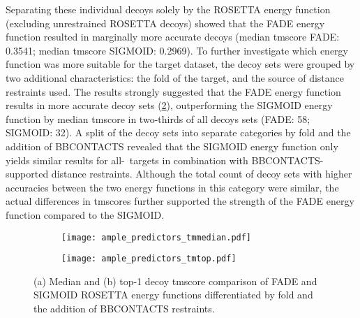 Separating these individual decoys solely by the ROSETTA energy function (excluding unrestrained ROSETTA decoys) showed that the FADE energy function resulted in marginally more accurate decoys (median \gls{tmscore} FADE: 0.3541; median \gls{tmscore} SIGMOID: 0.2969). To further investigate which energy function was more suitable for the target dataset, the decoy sets were grouped by two additional characteristics: the fold of the target, and the source of distance restraints used. The results strongly suggested that the FADE energy function results in more accurate decoy sets (\cref{fig:ample_predictor_tmmedian}), outperforming the SIGMOID energy function by median \gls{tmscore} in two-thirds of all decoys sets (FADE: 58; SIGMOID: 32). A split of the decoy sets into separate categories by fold and the addition of BBCONTACTS revealed that the SIGMOID energy function only yields similar results for all-\textbeta\ targets in combination with BBCONTACTS-supported distance restraints. Although the total count of decoy sets with higher accuracies between the two energy functions in this category were similar, the actual differences in \gls{tmscore}s further supported the strength of the FADE energy function compared to the SIGMOID.

\begin{figure}[H]
    \centering
    \begin{subfigure}[b]{\textwidth}
        \centering
        \texttt{[image: ample\_predictors\_tmmedian.pdf]}
        \caption{}
        \label{fig:ample_predictor_tmmedian}
    \end{subfigure}
\end{figure}

\begin{figure}[H]\ContinuedFloat
    \begin{subfigure}[b]{\textwidth}
        \centering
        \texttt{[image: ample\_predictors\_tmtop.pdf]}
        \caption{}
        \label{fig:ample_predictor_tmtop}
    \end{subfigure}
    \caption[TM-score comparison between ROSETTA energy functions]{(a) Median and (b) top-1 decoy \gls{tmscore} comparison of FADE and SIGMOID ROSETTA energy functions differentiated by fold and the addition of BBCONTACTS restraints.}
\end{figure}

